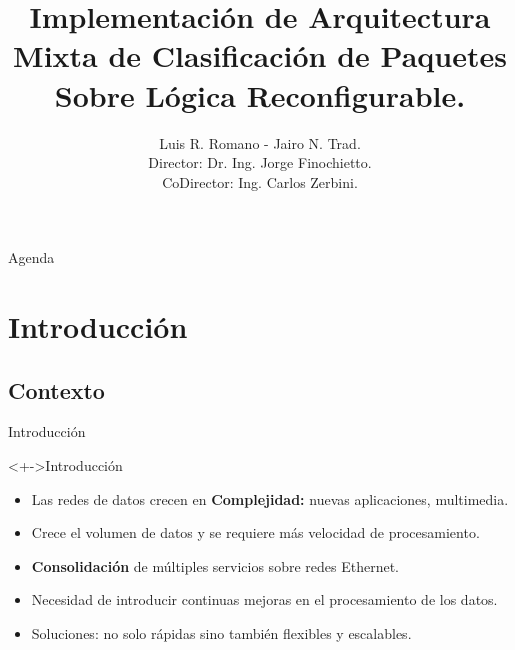 \documentclass[xcolor=dvipsnames]{beamer}
\title[] {Implementación de Arquitectura Mixta de Clasificación de Paquetes Sobre Lógica Reconfigurable.}
\author[] 
{
	Luis R. Romano - Jairo N. Trad. \\
	\scriptsize Director: Dr. Ing. Jorge Finochietto. \\
  	\scriptsize CoDirector: Ing. Carlos Zerbini. \\ 
}
\institute[Universidades] %
{   
  \scriptsize Laboratorio de Comunicaciones Digitales \\
  \scriptsize Universidad Nacional de Córdoba, Facultad Ciencias Exactas, Físicas y Naturales \\ 
}
\begin{document}
\begin{frame}
  \titlepage
\end{frame}

\begin{frame}{Agenda}
  \tiny 
  \tableofcontents
\end{frame}

\scriptsize

\section{Introducción}

\subsection{Contexto}

\begin{frame}{Introducción}
  \scriptsize
  
  \begin{block}<+->{Introducción}

    \begin{itemize}
      \item Las redes de datos crecen en {\bf Complejidad:} nuevas aplicaciones, multimedia.
      \item Crece el volumen de datos y se requiere más velocidad de procesamiento.
      \item {\bf Consolidación} de múltiples servicios sobre redes Ethernet.     
      \item Necesidad de introducir continuas mejoras en el procesamiento de los datos.
      \item Soluciones: no solo rápidas sino también flexibles y escalables.
    \end{itemize}
    
  \end{block}
    

\end{frame}
\end{document}
